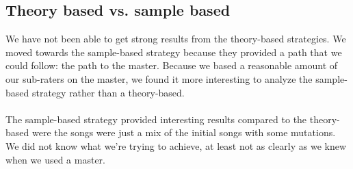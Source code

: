 \documentclass[a4paper]{article}
\begin{document}
\subsection{Theory based vs. sample based}
We have not been able to get strong results from the theory-based strategies. We moved towards the sample-based strategy because they provided a path that we could follow: the path to the master. Because we based a reasonable amount of our sub-raters on the master, we found it more interesting to analyze the sample-based strategy rather than a theory-based.
\\\\
The sample-based strategy provided interesting results compared to the theory-based were the songs were just a mix of the initial songs with some mutations. We did not know what we're trying to achieve, at least not as clearly as we knew when we used a master.
\end{document}
